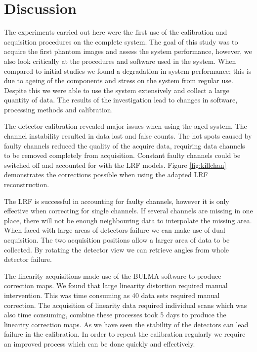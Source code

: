 \section{Discussion}
The experiments carried out here were the first use of the calibration and acquisition procedures on the complete system. The goal of this study was to acquire the first phantom images and assess the system performance, however, we also look critically at the procedures and software used in the system. When compared to initial studies \cite{Michele} we found a degradation in system performance; this is due to ageing of the components and stress on the system from regular use. Despite this we were able to use the system extensively and collect a large quantity of data. The results of the investigation lead to changes in software, processing methods and calibration. 

The detector calibration revealed major issues when using the aged system. The channel instability resulted in data lost and false counts. The hot spots caused by faulty channels reduced the quality of the acquire data, requiring data channels to be removed completely from acquisition. Constant faulty channels could be switched off and accounted for with the \acrshort{LRF} models. Figure \ref{fig:killchan} demonstrates the corrections possible when using the adapted \acrshort{LRF} reconstruction. 

The \acrshort{LRF} is successful in accounting for faulty channels, however it is only effective when correcting for single channels. If several channels are missing in one place, there will not be enough neighbouring data to interpolate the missing area. When faced with large areas of detectors failure we can make use of dual acquisition. The two acquisition positions allow a larger area of data to be collected. By rotating the detector view we can retrieve angles from whole detector failure.

The linearity acquisitions made use of the BULMA software to produce correction maps. We found that large linearity distortion required manual intervention. This was time consuming as 40 data sets required manual correction. The acquisition of linearity data required individual scans which was also time consuming, combine these processes took 5 days to produce the linearity correction maps. As we have seen the stability of the detectors can lead failure in the calibration. In order to repeat the calibration regularly we require an improved process which can be done quickly and effectively.

